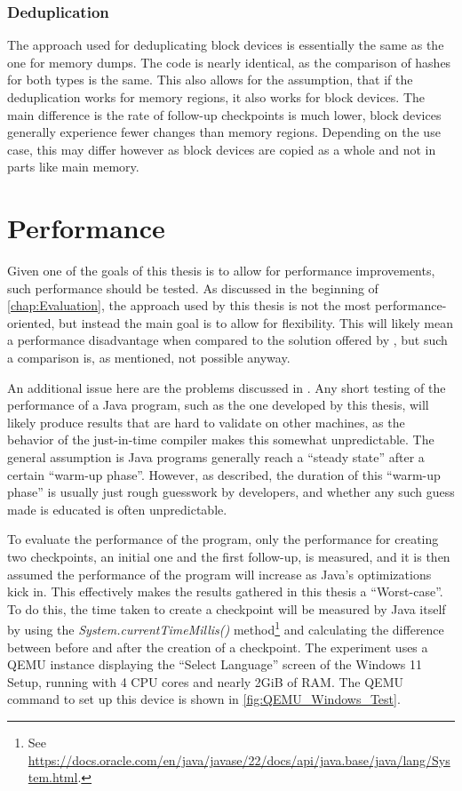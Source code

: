 \subsubsection*{Deduplication}
The approach used for deduplicating block devices is essentially the same as the one for memory dumps.
The code is nearly identical, as the comparison of hashes for both types is the same.
This also allows for the assumption, that if the deduplication works for memory regions,
it also works for block devices.
The main difference is the rate of follow-up checkpoints is much lower,
block devices generally experience fewer changes than memory regions.
Depending on the use case, this may differ however as block devices are copied as a whole and not in parts like main memory.

\section{Performance}\label{sec:eval_performance}
Given one of the goals of this thesis is to allow for performance improvements,
such performance should be tested.
As discussed in the beginning of \autoref{chap:Evaluation},
the approach used by this thesis is not the most performance-oriented,
but instead the main goal is to allow for flexibility.
This will likely mean a performance disadvantage when compared to the solution offered by \citeauthor{kitcheckpoints},
but such a comparison is, as mentioned, not possible anyway.

An additional issue here are the problems \citeauthor{Java_Benchmarking} discussed in \cite{Java_Benchmarking}.
Any short testing of the performance of a Java program, such as the one developed by this thesis,
will likely produce results that are hard to validate on other machines,
as the behavior of the just-in-time compiler makes this somewhat unpredictable.
The general assumption is Java programs generally reach a \enquote{steady state} after a certain \enquote{warm-up phase}.
However, as \citeauthor{Java_Benchmarking} described, the duration of this \enquote{warm-up phase}
is usually just rough guesswork by developers,
and whether any such guess made is educated is often unpredictable\cite{Java_Benchmarking}.

To evaluate the performance of the program,
only the performance for creating two checkpoints,
an initial one and the first follow-up,
is measured, and it is then assumed the performance of the program will increase as Java's optimizations kick in.
This effectively makes the results gathered in this thesis a \enquote{Worst-case}.
To do this, the time taken to create a checkpoint will be measured by Java itself
by using the \emph{System.currentTimeMillis()} method\footnote{See \href{https://docs.oracle.com/en/java/javase/22/docs/api/java.base/java/lang/System.html#currentTimeMillis()}{https://docs.oracle.com/en/java/javase/22/docs/api/java.base/java/lang/System.html}.}
and calculating the difference between before and after the creation of a checkpoint.
The experiment uses a QEMU instance displaying the \enquote{Select Language} screen of the Windows 11 Setup,
running with 4 CPU cores and nearly 2GiB of RAM.
The QEMU command to set up this device is shown in \autoref{fig:QEMU_Windows_Test}.

